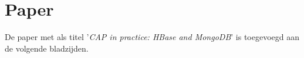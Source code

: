 \chapter{Paper}
De paper met als titel '\textit{CAP in practice: HBase and MongoDB}' is toegevoegd aan de volgende bladzijden. 
